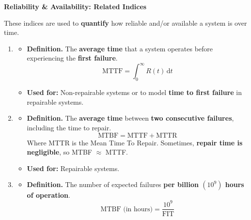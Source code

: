 \newpage
\begin{flushleft}
    \textcolor{Red2}{ \textbf{Reliability \& Availability: Related Indices}}
\end{flushleft}
These indices are used to \textbf{quantify} how reliable and/or available a system is over time.
\begin{enumerate}
    \item {}
    \begin{itemize}
        \item[\textcolor{Red2}{\faIcon{book}}] \textcolor{Red2}{\textbf{Definition.}} The \textbf{average time} that a system operates before experiencing the \textbf{first failure}.
        \begin{equation}
            \text{MTTF} = \displaystyle\int_{0}^{\infty} R(t) \, \mathrm{d}t
        \end{equation}
        \item[\textcolor{Green3}{\faIcon{tools}}] \textcolor{Green3}{\textbf{Used for:}} Non-repairable systems or to model \textbf{time to first failure} in repairable systems.
    \end{itemize}
    \item {}
    \begin{itemize}
        \item[\textcolor{Red2}{\faIcon{book}}] \textcolor{Red2}{\textbf{Definition.}} The \textbf{average time} between \textbf{two consecutive failures}, including the time to repair.
        \begin{equation}
            \text{MTBF} = \text{MTTF} + \text{MTTR}
        \end{equation}
        Where MTTR is the Mean Time To Repair. Sometimes, \textbf{repair time is negligible}, so MTBF $\approx$ MTTF.
        \item[\textcolor{Green3}{\faIcon{tools}}] \textcolor{Green3}{\textbf{Used for:}} Repairable systems.
    \end{itemize}
    \item {}
    \begin{itemize}
        \item[\textcolor{Red2}{\faIcon{book}}] \textcolor{Red2}{\textbf{Definition.}} The number of expected failures \textbf{per billion $\left(10^{9}\right)$ hours of operation}.
        \begin{equation}
            \text{MTBF (in hours)} = \dfrac{10^{9}}{\text{FIT}}

\end{equation}
\end{itemize}
\end{enumerate}
